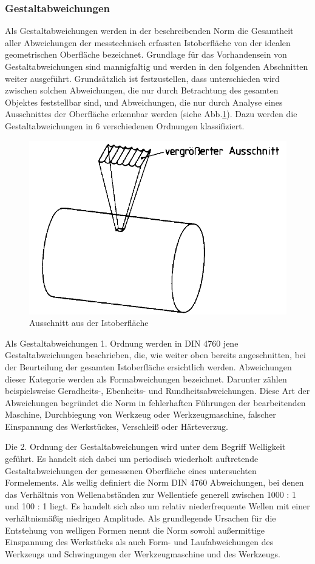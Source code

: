 \subsubsection{Gestaltabweichungen}

Als Gestaltabweichungen werden in der beschreibenden Norm die Gesamtheit aller Abweichungen der messtechnisch erfassten Istoberfläche von der idealen geometrischen Oberfläche bezeichnet. Grundlage für das Vorhandensein von Gestaltabweichungen sind mannigfaltig und werden in den folgenden Abschnitten weiter ausgeführt. Grundsätzlich ist festzustellen, dass unterschieden wird zwischen solchen Abweichungen, die nur durch Betrachtung des gesamten Objektes feststellbar sind, und Abweichungen, die nur durch Analyse eines Ausschnittes der Oberfläche erkennbar werden (siehe Abb.\ref{fig:din4760_1}). Dazu werden die Gestaltabweichungen in 6 verschiedenen Ordnungen klassifiziert. 


\begin{figure}[h]
	\centering
	\includegraphics[width=0.5\linewidth]{img/DIN_4760_1}
	\caption[Ausschnitt aus der Istoberfläche zur Beurteilung der Gestaltabweichung]{Ausschnitt aus der Istoberfläche}
	\label{fig:din4760_1}
\end{figure}

Als Gestaltabweichungen 1. Ordnung werden in DIN 4760 jene Gestaltabweichungen beschrieben, die, wie weiter oben bereits angeschnitten, bei der Beurteilung der gesamten Istoberfläche ersichtlich werden. Abweichungen dieser Kategorie werden als Formabweichungen bezeichnet. Darunter zählen beispielsweise Geradheits-, Ebenheits- und Rundheitsabweichungen. Diese Art der Abweichungen begründet die Norm in fehlerhaften Führungen der bearbeitenden Maschine, Durchbiegung von Werkzeug oder Werkzeugmaschine, falscher Einspannung des Werkstückes, Verschleiß oder Härteverzug.

Die 2. Ordnung der Gestaltabweichungen wird unter dem Begriff Welligkeit geführt. Es handelt sich dabei um periodisch wiederholt auftretende Gestaltabweichungen der gemessenen Oberfläche eines untersuchten Formelements. Als wellig definiert die Norm DIN 4760 Abweichungen, bei denen das Verhältnis von Wellenabständen zur Wellentiefe generell zwischen 1000 : 1 und 100 : 1 liegt. Es handelt sich also um relativ niederfrequente Wellen mit einer verhältnismäßig niedrigen Amplitude. Als grundlegende Ursachen für die Entstehung von welligen Formen nennt die Norm sowohl außermittige Einspannung des Werkstücks als auch Form- und Laufabweichungen des Werkzeugs und Schwingungen der Werkzeugmaschine und des Werkzeugs.

